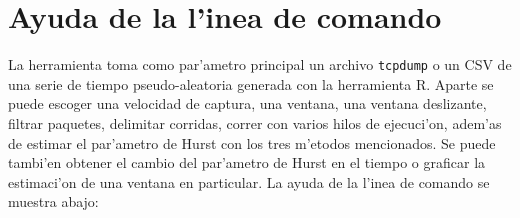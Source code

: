 \section{Ayuda de la l'inea de comando} \label{sect:ayuda}

La herramienta toma como par'ametro principal un archivo {\tt tcpdump} o un CSV
de una serie de tiempo pseudo-aleatoria generada con la herramienta R.
Aparte se puede escoger una velocidad de captura, una ventana, una ventana
deslizante, filtrar paquetes, delimitar corridas, correr con varios hilos de
ejecuci'on, adem'as de estimar el par'ametro de Hurst con los tres m'etodos
mencionados. Se puede tambi'en obtener el cambio del par'ametro de Hurst en el
tiempo o graficar la estimaci'on de una ventana en particular. La ayuda de la
l'inea de comando se muestra abajo:

